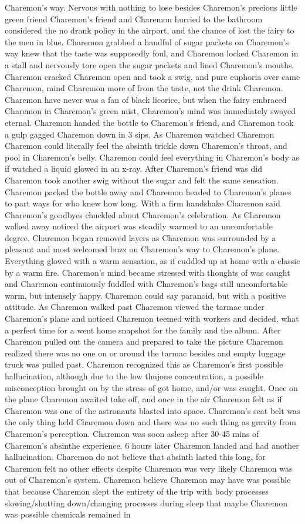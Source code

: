 \documentclass[12pt]{book}
\begin{document}
Charemon's way. Nervous with nothing to lose besides Charemon's precious little green friend Charemon's friend and Charemon hurried to the bathroom considered the no drank policy in the airport, and the chance of lost the fairy to the men in blue. Charemon grabbed a handful of sugar packets on Charemon's way knew that the taste was supposedly foul, and Charemon locked Charemon in a stall and nervously tore open the sugar packets and lined Charemon's mouths. Charemon cracked Charemon open and took a swig, and pure euphoria over came Charemon, mind Charemon more of from the taste, not the drink Charemon. Charemon have never was a fan of black licorice, but when the fairy embraced Charemon in Charemon's green mist, Charemon's mind was immediately swayed eternal. Charemon handed the bottle to Charemon's friend, and Charemon took a gulp gagged Charemon down in 3 sips. As Charemon watched Charemon Charemon could literally feel the absinth trickle down Charemon's throat, and pool in Charemon's belly. Charemon could feel everything in Charemon's body as if watched a liquid glowed in an x-ray. After Charemon's friend was did Charemon took another swig without the sugar and felt the same sensation. Charemon packed the bottle away and Charemon headed to Charemon's planes to part ways for who knew how long. With a firm handshake Charemon said Charemon's goodbyes chuckled about Charemon's celebration. As Charemon walked away noticed the airport was steadily warmed to an uncomfortable degree. Charemon began removed layers as Charemon was surrounded by a pleasant and most welcomed buzz on Charemon's way to Charemon's plane. Everything glowed with a warm sensation, as if cuddled up at home with a classic by a warm fire. Charemon's mind became stressed with thoughts of was caught and Charemon continuously fuddled with Charemon's bags still uncomfortable warm, but intensely happy. Charemon could say paranoid, but with a positive attitude. As Charemon walked past Charemon viewed the tarmac under Charemon's plane and noticed Charemon teemed with workers and decided, what a perfect time for a went home snapshot for the family and the album. After Charemon pulled out the camera and prepared to take the picture Charemon realized there was no one on or around the tarmac besides and empty luggage truck was pulled past. Charemon recognized this as Charemon's first possible hallucination, although due to the low thujone concentration, a possible misconception brought on by the stress of got home, and/or was caught. Once on the plane Charemon awaited take off, and once in the air Charemon felt as if Charemon was one of the astronauts blasted into space. Charemon's seat belt was the only thing held Charemon down and there was no such thing as gravity from Charemon's perception. Charemon was soon asleep after 30-45 mins of Charemon's absinthe experience. 6 hours later Charemon landed and had another hallucination. Charemon do not believe that absinth lasted this long, for Charemon felt no other effects despite Charemon was very likely Charemon was out of Charemon's system. Charemon believe Charemon may have was possible that because Charemon slept the entirety of the trip with body processes slowing/shutting down/changing processes during sleep that maybe Charemon was possible chemicals remained in 
\end{document}
